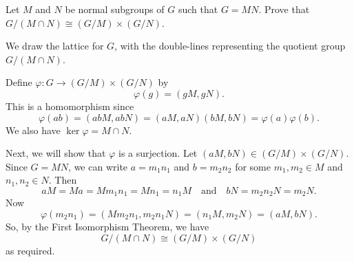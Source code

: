  Let $M$ and $N$ be normal subgroups of $G$ such that
$G = MN$. Prove that $G/(M\cap N)\cong(G/M)\times(G/N)$.
\begin{solution}
  We draw the lattice for $G$, with the double-lines representing the
  quotient group $G/(M\cap N)$.
  \begin{center}
  \end{center}
  Define $\varphi\colon G\to(G/M)\times(G/N)$ by
  \begin{equation*}
    \varphi(g) = (gM, gN).
  \end{equation*}
  This is a homomorphism since
  \begin{equation*}
    \varphi(ab) = (abM, abN) = (aM, aN)(bM, bN) = \varphi(a)\varphi(b).
  \end{equation*}
  We also have $\ker\varphi = M\cap N$.

  Next, we will show that $\varphi$ is a surjection. Let
  $(aM, bN)\in(G/M)\times(G/N)$. Since $G = MN$, we can write
  $a = m_1n_1$ and $b = m_2n_2$ for some $m_1,m_2\in M$ and
  $n_1,n_2\in N$. Then
  \begin{equation*}
    aM = Ma = Mm_1n_1 = Mn_1 = n_1M
    \quad\text{and}\quad
    bN = m_2n_2N = m_2N.
  \end{equation*}
  Now
  \begin{equation*}
    \varphi(m_2n_1)
    = (Mm_2n_1, m_2n_1N)
    = (n_1M, m_2N)
    = (aM, bN).
  \end{equation*}
  So, by the First Isomorphism Theorem, we have
  \begin{equation*}
    G/(M\cap N)\cong(G/M)\times(G/N)
  \end{equation*}
  as required.
\end{solution}
